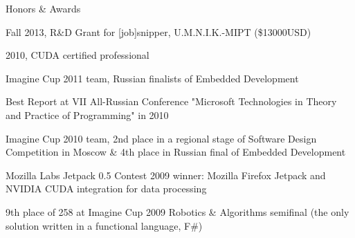 \documentclass{resume} %
\begin{document}
\begin{rSubsectionSchools}{Honors \& Awards}
\item Fall 2013, R\&D Grant for [job]snipper, U.M.N.I.K.-MIPT (\$13000USD)
\item 2010, CUDA certified professional
\item Imagine Cup 2011 team, Russian finalists of Embedded Development
\item Best Report at VII All-Russian Conference "Microsoft Technologies in Theory and Practice of Programming" in 2010
\item Imagine Cup 2010 team, 2nd place in a regional stage of Software Design Competition in Moscow \& 4th place in Russian final of Embedded Development
\item Mozilla Labs Jetpack 0.5 Contest 2009 winner: Mozilla Firefox Jetpack and NVIDIA CUDA integration for data processing
\item 9th place of 258 at Imagine Cup 2009 Robotics \& Algorithms semifinal (the only solution written in a functional language, F\#)
\end{rSubsectionSchools}

\end{document}
